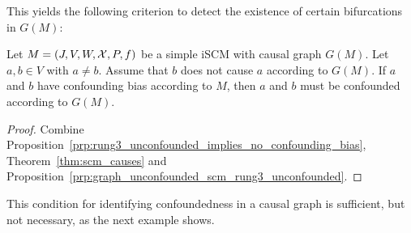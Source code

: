 This yields the following criterion to detect the existence of certain bifurcations in $G(M)$:
\begin{Cor}\label{cor:scm_identify_bifurcation}
Let $M = \left ( J, V, W, \mathcal{X}, P, f \right )$ be a simple iSCM with causal graph $G(M)$.
Let $a, b \in V$ with $a \ne b$.
Assume that $b$ does not cause $a$ according to $G(M)$.
If $a$ and $b$ have confounding bias according to $M$, then $a$ and $b$ must be confounded according to $G(M)$.
\end{Cor}
\begin{proof}
  Combine Proposition~\ref{prp:rung3_unconfounded_implies_no_confounding_bias}, Theorem~\ref{thm:scm_causes} and Proposition~\ref{prp:graph_unconfounded_scm_rung3_unconfounded}.
\end{proof}
This condition for identifying confoundedness in a causal graph is sufficient, but not necessary, as the next example shows.
